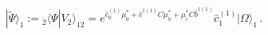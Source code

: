 \begin{equation}
|\tilde{\Psi}\rangle_1 :={}_2\langle \Psi |V_{2}\rangle_{12} 
=e^{\hat{c}_{0}^{(1)}\mu_{0}^{\ast }+\hat{c}^{\dagger (1)}C\mu _{b}^{\ast }
+\mu _{c}^{\ast }C\hat{b}^{\dagger(1)}}\hat{c}_{1}^{(1)}|\Omega \rangle_1 \,.
\end{equation}


